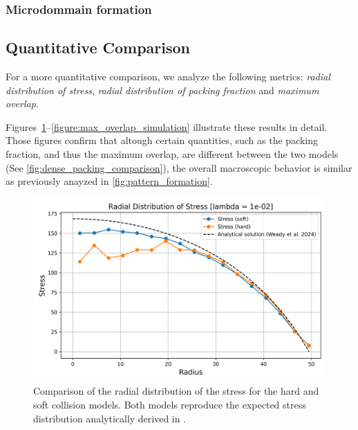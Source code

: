 \documentclass[conference]{IEEEtran}
\begin{document}
\subsubsection{Microdommain formation}

\cite{You2018}


\newpage

\subsection{Quantitative Comparison}

For a more quantitative comparison, we analyze the following metrics: \textit{radial distribution of stress}, \textit{radial distribution of packing fraction} and \textit{maximum overlap}.

Figures~\ref{figure:radial_distribution_stress}--\ref{figure:max_overlap_simulation} illustrate these results in detail. Those figures confirm that altough certain quantities, such as the packing fraction, and thus the maximum overlap, are different between the two models (See \autoref{fig:dense_packing_comparison}), the overall macroscopic behavior is similar as previously anayzed in \autoref{fig:pattern_formation}.


\begin{figure}[h]
    \centering
    \includegraphics[width=\linewidth]{figures/comparisons/radial_distribution_stress.png}
    \caption{Comparison of the radial distribution of the stress for the hard and soft collision models. Both models reproduce the expected stress distribution analytically derived in \cite{Weady2024}.}
    \label{figure:radial_distribution_stress}
\end{figure}
\end{document}
